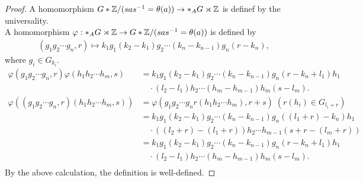 \begin{proof}
  A homomorphism  $G*\mathbb{Z}/(sas^{-1}=\theta(a)) \rightarrow *_A G \rtimes \mathbb{Z}$ is definef by the universality. \\
  A homomorphism  $ \varphi : *_A G \rtimes \mathbb{Z} \rightarrow G*\mathbb{Z}/(sas^{-1}=\theta(a))$ is defined by
  \begin{align*}
    (g_1 g_2 \cdots g_n , r) \mapsto k_1 g_1 (k_2 -k_1) g_2 \cdots (k_n - k_{n-1}) g_n (r - k_n),
  \end{align*}
  where $g_i \in G_{k_i}$.
  \begin{align*}
    \varphi (g_1 g_2 \cdots g_n , r) \varphi (h_1 h_2 \cdots h_m , s)
    &=  k_1 g_1 (k_2 -k_1) g_2 \cdots (k_n - k_{n-1}) g_n (r - k_n + l_1) h_1\\
    &\quad \cdot (l_2 -l_1) h_2 \cdots (h_m - h_{m-1}) h_m (s - l_m). \\
    \varphi ((g_1 g_2 \cdots g_n ,r)(h_1 h_2 \cdots h_m , s))
    &= \varphi (g_1 g_2 \cdots g_n r(h_1 h_2 \cdots h_m) , r + s) \;
    \mbox{$(r(h_i) \in G_{l_i + r} )$}\\
    &= k_1 g_1 (k_2 -k_1) g_2 \cdots (k_n - k_{n-1})  g_n ((l_1 + r) -k_n) h_1 \\
    &\quad \cdot ((l_2 + r) - (l_1 + r)) h_2 \cdots h_{m-1} (s + r - (l_m + r)) \\
    &=  k_1 g_1 (k_2 -k_1) g_2 \cdots (k_n - k_{n-1}) g_n (r - k_n + l_1) h_1\\
    &\quad \cdot (l_2 -l_1) h_2 \cdots (h_m - h_{m-1}) h_m (s - l_m). \\
  \end{align*}
  By the above calculation, the definition is well-defined.
\end{proof}

